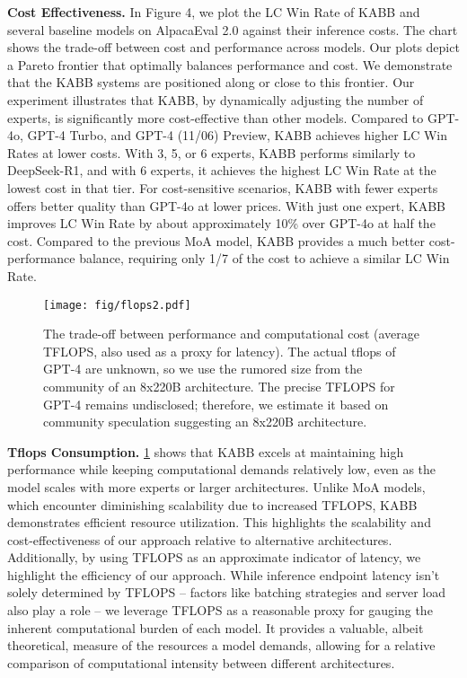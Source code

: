 \textbf{Cost Effectiveness.} In Figure 4, we plot the LC Win Rate of KABB and several baseline models on AlpacaEval 2.0 against their inference costs. The chart shows the trade-off between cost and performance across models. Our plots depict a Pareto frontier that optimally balances performance and cost. We demonstrate that the KABB systems are positioned along or close to this frontier. Our experiment illustrates that KABB, by dynamically adjusting the number of experts, is significantly more cost-effective than other models. Compared to GPT-4o, GPT-4 Turbo, and GPT-4 (11/06) Preview, KABB achieves higher LC Win Rates at lower costs. With 3, 5, or 6 experts, KABB performs similarly to DeepSeek-R1, and with 6 experts, it achieves the highest LC Win Rate at the lowest cost in that tier. For cost-sensitive scenarios, KABB with fewer experts offers better quality than GPT-4o at lower prices. With just one expert, KABB improves LC Win Rate by about approximately 10\% over GPT-4o at half the cost. Compared to the previous MoA model, KABB provides a much better cost-performance balance, requiring only 1/7 of the cost to achieve a similar LC Win Rate. 

\begin{figure}[h]
\begin{center}
\centerline{\texttt{[image: fig/flops2.pdf]}}
\caption{The trade-off between performance and computational cost (average TFLOPS, also used as a proxy for latency). The actual tflops of GPT-4 are unknown, so we use the rumored size from the community of an 8x220B architecture. The precise TFLOPS for GPT-4 remains undisclosed; therefore, we estimate it based on community speculation suggesting an 8x220B architecture.}
\label{tflops}
\end{center}
\end{figure}

\textbf{Tflops Consumption.} \cref{tflops} shows that KABB excels at maintaining high performance while keeping computational demands relatively low, even as the model scales with more experts or larger architectures. Unlike MoA models, which encounter diminishing scalability due to increased TFLOPS, KABB demonstrates efficient resource utilization. This highlights the scalability and cost-effectiveness of our approach relative to alternative architectures. Additionally, by using TFLOPS as an approximate indicator of latency, we highlight the efficiency of our approach. While inference endpoint latency isn't solely determined by TFLOPS -- factors like batching strategies and server load also play a role -- we leverage TFLOPS as a reasonable proxy for gauging the inherent computational burden of each model. It provides a valuable, albeit theoretical, measure of the resources a model demands, allowing for a relative comparison of computational intensity between different architectures.



